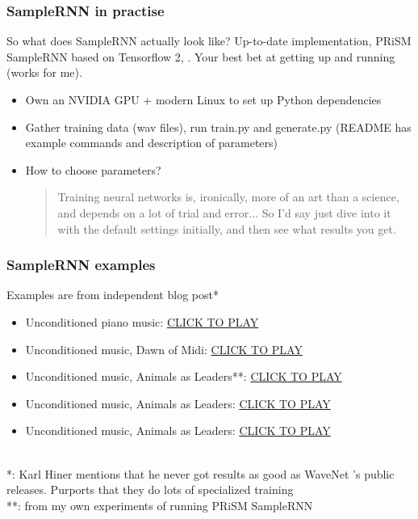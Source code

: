 \documentclass{beamer}
\begin{document}
\begin{frame}
	\frametitle{SampleRNN in practise}
	So what does SampleRNN actually look like? Up-to-date implementation, PRiSM SampleRNN based on Tensorflow 2, . Your best bet at getting up and running (works for me).
	\begin{itemize}
		\item
			Own an NVIDIA GPU + modern Linux to set up Python dependencies
		\item
			Gather training data (wav files), run train.py and generate.py (README has example commands and description of parameters)
		\item
			How to choose parameters?
			\begin{quote}
				Training neural networks is, ironically, more of an art than a science, and depends on a lot of trial and error... So I'd say just dive into it with the default settings initially, and then see what results you get.
			\end{quote}
	\end{itemize}
\end{frame}


\begin{frame}
	\frametitle{SampleRNN examples}
	Examples are from independent blog post*
	\begin{itemize}
		\item
			Unconditioned piano music: \href{run:./samplernn_sample_2.mp3}{CLICK TO PLAY}
		\item
			Unconditioned music, Dawn of Midi: \href{run:./samplernn_sample_1.mp3}{CLICK TO PLAY}
		\item
			Unconditioned music, Animals as Leaders**: \href{run:./aamgen_epoch_45.wav}{CLICK TO PLAY}
		\item
			Unconditioned music, Animals as Leaders: \href{run:./aamgen_epoch_75.wav}{CLICK TO PLAY}
		\item
			Unconditioned music, Animals as Leaders: \href{run:./aamgen_epoch_80.wav}{CLICK TO PLAY}
	\end{itemize}\ \\
	\vspace{1em}
	*: Karl Hiner mentions that he never got results as good as WaveNet 's public releases. Purports that they do lots of specialized training\\
	**: from my own experiments of running PRiSM SampleRNN
\end{frame}
\end{document}
